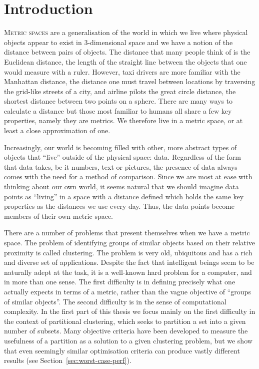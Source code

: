 \chapter{Introduction}
\label{cha:introduction}

\textsc{Metric spaces} are a generalisation of the world in which we live
where physical objects appear to exist in 3-dimensional space and we have a
notion of the distance between pairs of objects.  The distance that many
people think of is the Euclidean distance, the length of the straight line
between the objects that one would measure with a ruler.  However, taxi
drivers are more familiar with the Manhattan distance, the distance one must
travel between locations by traversing the grid-like streets of a city, and
airline pilots the great circle distance, the shortest distance between two
points on a sphere.  There are many ways to calculate a distance but those
most familiar to humans all share a few key properties, namely they are
metrics.  We therefore live in a metric space, or at least a close
approximation of one.

Increasingly, our world is becoming filled with other, more abstract types of
objects that ``live'' outside of the physical space: data.  Regardless of the
form that data takes, be it numbers, text or pictures, the presence of data
always comes with the need for a method of comparison.  Since we are most at
ease with thinking about our own world, it seems natural that we should
imagine data points as ``living'' in a space with a distance defined which
holds the same key properties as the distances we use every day.  Thus, the
data points become members of their own metric space.

There are a number of problems that present themselves when we have a metric
space.  The problem of identifying groups of similar objects based on their
relative proximity is called clustering.  The problem is very old, ubiquitous
and has a rich and diverse set of applications.  Despite the fact that
intelligent beings seem to be naturally adept at the task, it is a well-known
hard problem for a computer, and in more than one sense.  The first difficulty
is in defining precisely what one actually expects in terms of a metric,
rather than the vague objective of ``groups of similar objects''.  The second
difficulty is in the sense of computational complexity.  In the first part of
this thesis we focus mainly on the first difficulty in the context of
partitional clustering, which seeks to partition a set into a given number of
subsets.  Many objective criteria have been developed to measure the
usefulness of a partition as a solution to a given clustering problem, but we
show that even seemingly similar optimisation criteria can produce vastly
different results (see Section~\ref{sec:worst-case-perf}).

